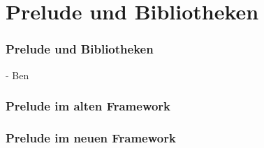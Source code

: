 \section{Prelude und Bibliotheken}

\begin{frame}
\frametitle{Prelude und Bibliotheken}
- Ben
\end{frame}

\begin{frame}
\frametitle{Prelude im alten Framework}

\begin{figure}
\end{figure}
\end{frame}

\begin{frame}
\frametitle{Prelude im neuen Framework}

\begin{figure}
\end{figure}
\end{frame}

